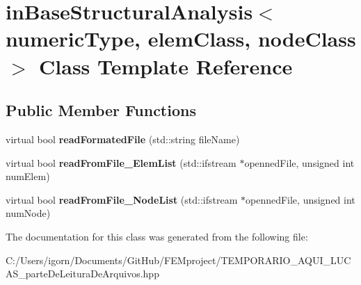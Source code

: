 \hypertarget{classin_base_structural_analysis}{}\section{in\+Base\+Structural\+Analysis$<$ numeric\+Type, elem\+Class, node\+Class $>$ Class Template Reference}
\label{classin_base_structural_analysis}
\subsection*{Public Member Functions}
\begin{DoxyCompactItemize}
\item 
\mbox{\label{classin_base_structural_analysis_a671ed159155ea702e7383e599957e068}} 
virtual bool {\bfseries read\+Formated\+File} (std\+::string file\+Name)
\item 
\mbox{\label{classin_base_structural_analysis_a4d566c9d25bd04ac67bb71db87542275}} 
virtual bool {\bfseries read\+From\+File\+\_\+\+Elem\+List} (std\+::ifstream $\ast$openned\+File, unsigned int num\+Elem)
\item 
\mbox{\label{classin_base_structural_analysis_a326c50dd5592d0e4e30cf65c8398e01b}} 
virtual bool {\bfseries read\+From\+File\+\_\+\+Node\+List} (std\+::ifstream $\ast$openned\+File, unsigned int num\+Node)
\end{DoxyCompactItemize}


The documentation for this class was generated from the following file\+:\begin{DoxyCompactItemize}
\item 
C\+:/\+Users/igorn/\+Documents/\+Git\+Hub/\+F\+E\+Mproject/T\+E\+M\+P\+O\+R\+A\+R\+I\+O\+\_\+\+A\+Q\+U\+I\+\_\+\+L\+U\+C\+A\+S\+\_\+parte\+De\+Leitura\+De\+Arquivos.\+hpp\end{DoxyCompactItemize}
